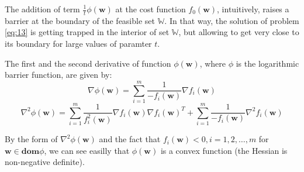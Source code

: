 \documentclass{beamer}
\begin{document}
\begin{frame}

\justifying
The addition of term $\frac{1}{t} \phi \left(\mathbf{w}\right)$ at the cost function $f_{0} \left(\mathbf{w}\right)$, intuitively, raises a barrier at the boundary of the feasible set $\mathbb{W}$. In that way, the solution of problem \eqref{eq:13} is getting trapped in the interior of set $\mathbb{W}$, but allowing to get very close to its boundary for large values of paramter $t$.

\vspace{0.4cm}
\justifying
The first and the second derivative of function $\phi \left(\mathbf{w}\right)$, where $\phi$ is the logarithmic barrier function, are given by:
$$
\nabla \phi \left( \mathbf{w} \right) = \sum_{i=1}^{m} \frac{1}{-f_{i}\left(\mathbf{w}\right)} \nabla f_{i} \left(\mathbf{w}\right)
$$
$$
\nabla^{2} \phi \left( \mathbf{w} \right) = \sum_{i=1}^{m} \frac{1}{f_{i}^{2}\left(\mathbf{w}\right)} \nabla f_{i} \left(\mathbf{w}\right) {\nabla f_{i} \left(\mathbf{w}\right)}^{T} + \sum_{i=1}^{m} \frac{1}{- f_{i}\left(\mathbf{w}\right)} \nabla^{2} f_{i} \left(\mathbf{w}\right)
$$

\vspace{0.4cm}
\justifying
By the form of $\nabla^{2} \phi \left( \mathbf{w} \right)$ and the fact that $f_{i} \left(\mathbf{w} \right) < 0, i=1,2,\dots,m$ for $\mathbf{w} \in \textbf{dom}\phi$, we can see easilly that $\phi\left(\mathbf{w}\right)$ is a convex function (the Hessian is non-negative definite).

\end{frame}
\end{document}
